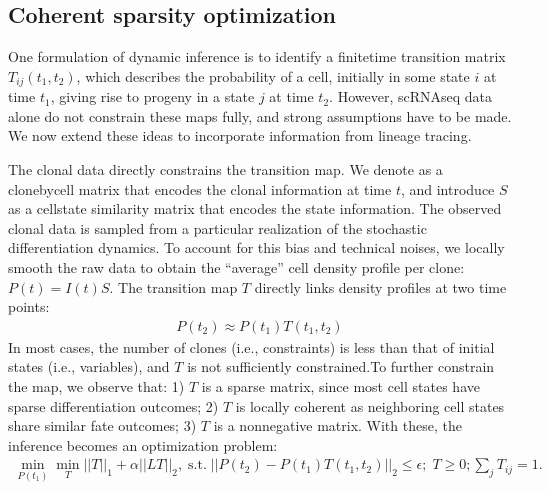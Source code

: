 \documentclass[letterpaper,10pt,english]{sphinxmanual}
\begin{document}
\subsection{Coherent sparsity optimization}
\label{\detokenize{about:coherent-sparsity-optimization}}
One formulation of dynamic inference is to identify a finite\sphinxhyphen{}time transition matrix \(T_{ij} (t_1,t_2)\), which describes the probability of a cell, initially in some state \(i\) at time \(t_1\), giving rise to progeny in a state \(j\) at time \(t_2\). However, scRNA\sphinxhyphen{}seq data alone do not constrain these maps fully, and strong assumptions have to be made.  We now extend these ideas to incorporate information from lineage tracing.

The clonal data directly constrains the transition map. We denote  as a clone\sphinxhyphen{}by\sphinxhyphen{}cell matrix that encodes the clonal information at time \(t\), and introduce  \(S\)  as a cell\sphinxhyphen{}state similarity matrix that encodes the state information. The observed clonal data is sampled from a particular realization of the stochastic differentiation dynamics. To account for this bias and technical noises, we locally smooth the raw data to obtain the “average” cell density profile per clone:  \(P(t)=I(t)S\).  The transition map \(T\) directly links density profiles at two time points:
\begin{equation*}
\begin{split}\begin{equation}
P(t_2 )\approx P(t_1 )T(t_1,t_2)
\end{equation}\end{split}
\end{equation*}
In most cases, the number of clones (i.e., constraints) is less than that of initial states (i.e., variables), and  \(T\) is not sufficiently constrained.To further constrain the map, we observe that: 1)  \(T\) is a sparse matrix, since most cell states have sparse differentiation outcomes; 2)  \(T\) is locally coherent as neighboring cell states share similar fate outcomes; 3) \(T\) is a non\sphinxhyphen{}negative matrix. With these, the inference becomes an optimization problem:
\begin{equation*}
\begin{split}\begin{equation}
 \min_{P(t_1)}\min_{T} ||T||_1+\alpha ||LT||_2,  \; \text{s.t.} \; ||P(t_2)- P(t_1) T(t_1,t_2)||_{2}\le\epsilon;\; T\ge 0; \sum_j T_{ij}=1.
 \end{equation}\end{split}
\end{equation*}
\end{document}
